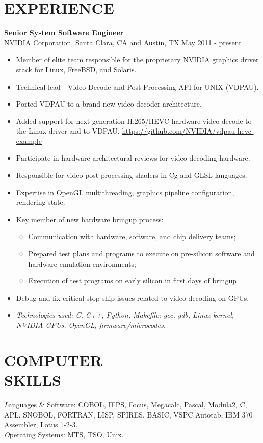 \documentclass[line,margin]{res}
\begin{document}
\begin{resume}
\section{EXPERIENCE}

\textbf{Senior System Software Engineer} \\
NVIDIA Corporation, Santa Clara, CA and Austin, TX \hfill May 2011 - present
\begin{itemize}  \itemsep -2pt %
\item Member of elite team responsible for the proprietary NVIDIA graphics
      driver stack for Linux, FreeBSD, and Solaris.
\item Technical lead - Video Decode and Post-Processing API for UNIX (VDPAU).
\item Ported VDPAU to a brand new video decoder architecture.
\item Added support for next generation H.265/HEVC hardware video decode to
      the Linux driver and to VDPAU.
      \url{https://github.com/NVIDIA/vdpau-hevc-example}
\item Participate in hardware architectural reviews for video decoding hardware.
\item Responsible for video post processing shaders in Cg and GLSL languages.
\item Expertise in OpenGL multithreading, graphics pipeline configuration,
      rendering state.
\item Key member of new hardware bringup process:
    \begin{itemize}  \itemsep -2pt %
    \item Communication with hardware, software, and chip delivery teams;
    \item Prepared test plans and programs to execute on pre-silicon software
          and hardware emulation environments;
    \item Execution of test programs on early silicon in first days of bringup
    \end{itemize}
\item Debug and fix critical stop-ship issues related to video decoding on GPUs.
\item \textit{Technologies used: C, C++, Python, Makefile; gcc, gdb, Linux
              kernel, NVIDIA GPUs, OpenGL, firmware/microcodes.}
\end{itemize}
 
\section{COMPUTER \\ SKILLS} {\textit Languages \& Software:} COBOL, IFPS, Focus, 
         Megacalc, Pascal, Modula2, C, APL, SNOBOL, 
                FORTRAN, LISP, SPIRES, BASIC, VSPC Autotab, 
                IBM 370 Assembler, Lotus 1-2-3. \\
                {\textit Operating Systems:} MTS, TSO, Unix.
 

\end{resume}
\end{document}
